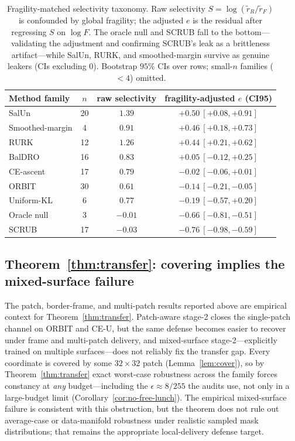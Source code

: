 \documentclass{article}
\begin{document}
\begin{table}[t]
  \centering
  \small
  \setlength{\tabcolsep}{6pt}
  \begin{tabular}{l c c c}
    \toprule
    Method family & $n$ & raw selectivity & fragility-adjusted $e$ (CI95) \\
    \midrule
    SalUn            & 20 & $1.39$ & $+0.50\ [+0.08,+0.91]$ \\
    Smoothed-margin  &  4 & $0.91$ & $+0.46\ [+0.18,+0.73]$ \\
    RURK             & 12 & $1.26$ & $+0.44\ [+0.21,+0.62]$ \\
    BalDRO           & 16 & $0.83$ & $+0.05\ [-0.12,+0.25]$ \\
    CE-ascent        & 17 & $0.79$ & $-0.02\ [-0.06,+0.01]$ \\
    ORBIT            & 30 & $0.61$ & $-0.14\ [-0.21,-0.05]$ \\
    Uniform-KL       &  6 & $0.77$ & $-0.19\ [-0.57,+0.20]$ \\
    Oracle null      &  3 & $-0.01$ & $-0.66\ [-0.81,-0.51]$ \\
    SCRUB            & 17 & $-0.03$ & $-0.76\ [-0.98,-0.59]$ \\
    \bottomrule
  \end{tabular}
  \caption{Fragility-matched selectivity taxonomy. Raw selectivity $S=\log(\tilde r_R/\tilde r_F)$ is confounded by global fragility; the adjusted $e$ is the residual after regressing $S$ on $\log F$. The oracle null and SCRUB fall to the bottom---validating the adjustment and confirming SCRUB's leak as a brittleness artifact---while SalUn, RURK, and smoothed-margin survive as genuine leakers (CIs excluding $0$). Bootstrap $95\%$ CIs over rows; small-$n$ families ($<4$) omitted.}
  \label{tab:adj-selectivity}
\end{table}

\subsection{Theorem~\ref{thm:transfer}: covering implies the mixed-surface failure}
The patch, border-frame, and multi-patch results reported above are empirical context for Theorem~\ref{thm:transfer}. Patch-aware stage-2 closes the single-patch channel on ORBIT and CE-U, but the same defense becomes easier to recover under frame and multi-patch delivery, and mixed-surface stage-2---explicitly trained on multiple surfaces---does not reliably fix the transfer gap. Every coordinate is covered by some $32\times 32$ patch (Lemma~\ref{lem:cover}), so by Theorem~\ref{thm:transfer} exact worst-case robustness across the family forces constancy at \emph{any} budget---including the $\epsilon \approx 8/255$ the audits use, not only in a large-budget limit (Corollary~\ref{cor:no-free-lunch}). The empirical mixed-surface failure is consistent with this obstruction, but the theorem does not rule out average-case or data-manifold robustness under realistic sampled mask distributions; that remains the appropriate local-delivery defense target.
\end{document}
